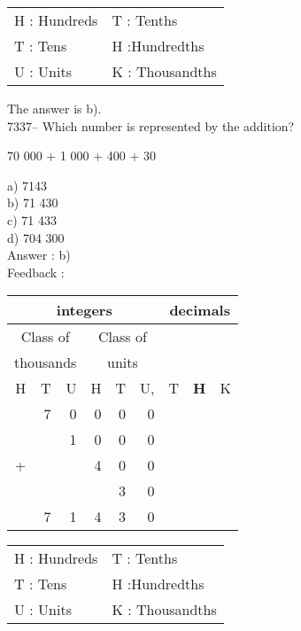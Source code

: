 \documentclass[letterpaper, 12pt]{article}
\begin{document}
\scriptsize
\begin{center}
\begin{tabular}{ll}
H : Hundreds & T\up{th} : Tenths\\
T : Tens & H\up{th} :Hundredths\\
U : Units & K\up{e} : Thousandths\\
\end{tabular}
\end{center}

\normalsize
The answer is b).\\



7337-- Which number is represented by the addition?\\
\begin{center}
70 000 + 1 000 + 400 + 30
\end{center}

a) 7143\\
b) 71 430\\
c) 71 433\\
d) 704 300\\

Answer : b)\\

Feedback :\\
\begin{center}
\begin{tabular}{|rrr|rrr|rrr|}
\hline
\multicolumn{6}{|c|}{integers} &\multicolumn{3}{|c|}{decimals} \\
\hline
\multicolumn{3}{|c|}{Class of} &\multicolumn{3}{|c|}{Class of} &  \multicolumn{3}{c|}{} \\
\multicolumn{3}{|c|}{thousands} &\multicolumn{3}{|c|}{units} &  \multicolumn{3}{c|}{} \\
\hline
H & T & U &H & T & U, & T\up{th} & \textbf{H\up{th}} & K\up{th} \\
\hline
\hline
  & 7 & 0 & 0 & 0 & 0 &  &  & \\
  &   & 1 & 0 & 0 & 0 &  &  & \\
+ &   &   & 4 & 0 & 0 &  &  & \\
  &   &   &   & 3 & 0 &  &  & \\
\hline
\hline
  & 7 & 1 & 4 & 3 & 0 &  &  & \\
\hline
\end{tabular}
\end{center}

\scriptsize
\begin{center}
\begin{tabular}{ll}
H : Hundreds & T\up{th} : Tenths\\
T : Tens & H\up{th} :Hundredths\\
U : Units & K\up{e} : Thousandths\\
\end{tabular}
\end{center}
\end{document}
